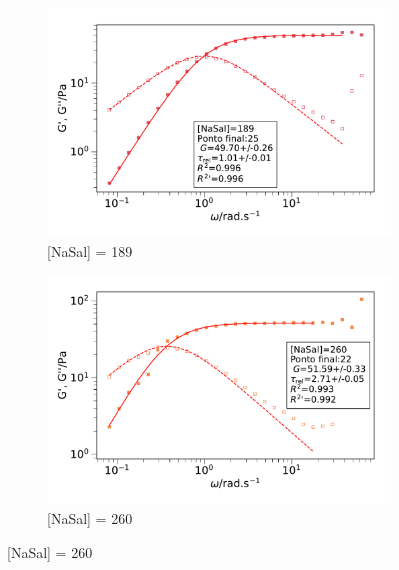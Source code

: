		\begin{figure}[h]
			\begin{subfigure}[t]{0.5\textwidth}
				\centering
				\includegraphics[width=\textwidth]{imagens/reologia/oscilatorio_agua_189}
				\caption{[NaSal] = 189 \mM}
				\label{fig:oscilatorio_agua_189}
			\end{subfigure} %
			\begin{subfigure}[t]{0.5\textwidth}
				\includegraphics[width=\textwidth]{imagens/reologia/oscilatorio_agua_260}
				\caption{[NaSal] = 260 \mM}
				\label{fig:oscilatorio_agua_260}
			\end{subfigure}
	

\end{figure}
